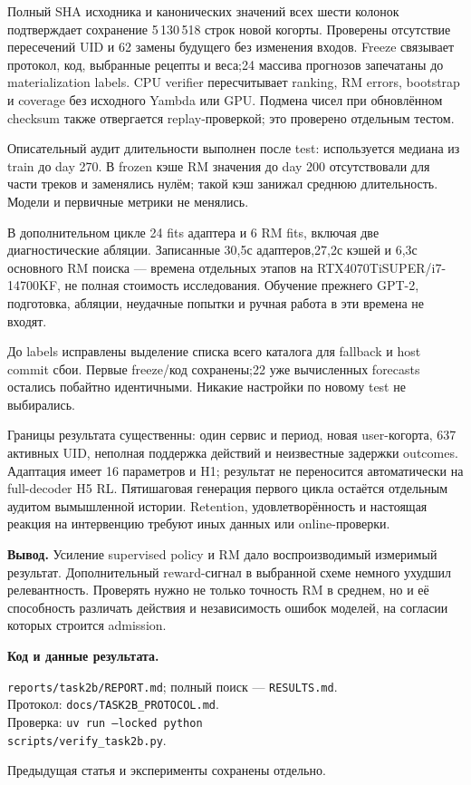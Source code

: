 \documentclass[10pt,a4paper,twocolumn]{article}
\begin{document}
Полный SHA исходника и канонических значений всех шести колонок подтверждает
сохранение 5\,130\,518 строк новой когорты. Проверены отсутствие пересечений UID
и 62 замены будущего без изменения входов. Freeze связывает протокол, код,
выбранные рецепты и веса;24 массива прогнозов запечатаны до materialization
labels. CPU verifier пересчитывает ranking, RM errors, bootstrap и coverage
без исходного Yambda или GPU. Подмена чисел при обновлённом checksum также
отвергается replay-проверкой; это проверено отдельным тестом.

Описательный аудит длительности выполнен после test: используется медиана
из train до day 270. В frozen кэше RM значения до day 200 отсутствовали для
части треков и заменялись нулём; такой кэш занижал среднюю длительность.
Модели и первичные метрики не менялись.

В дополнительном цикле 24 fits адаптера и 6 RM fits, включая две диагностические
абляции. Записанные 30,5с адаптеров,27,2с кэшей и 6,3с основного RM поиска ---
времена отдельных этапов на RTX4070TiSUPER/i7-14700KF, не полная стоимость
исследования. Обучение прежнего GPT-2, подготовка, абляции, неудачные попытки
и ручная работа в эти времена не входят.

До labels исправлены выделение списка всего каталога для fallback и host
commit сбои. Первые freeze/код сохранены;22 уже вычисленных forecasts
остались побайтно идентичными. Никакие настройки по новому test не выбирались.

Границы результата существенны: один сервис и период, новая user-когорта,
637 активных UID, неполная поддержка действий и неизвестные задержки outcomes.
Адаптация имеет 16 параметров и H1; результат не переносится автоматически
на full-decoder H5 RL. Пятишаговая генерация первого цикла остаётся отдельным
аудитом вымышленной истории. Retention, удовлетворённость и настоящая
реакция на интервенцию требуют иных данных или online-проверки.

\textbf{Вывод.} Усиление supervised policy и RM дало воспроизводимый
измеримый результат. Дополнительный reward-сигнал в выбранной схеме
немного ухудшил релевантность. Проверять нужно не только точность RM
в среднем, но и её способность различать действия и независимость
ошибок моделей, на согласии которых строится admission.

\vspace{3pt}
\noindent\textbf{Код и данные результата.}\par
{\footnotesize\raggedright\noindent
\nolinkurl{reports/task2b/REPORT.md}; полный поиск --- \texttt{RESULTS.md}.\\
Протокол: \nolinkurl{docs/TASK2B_PROTOCOL.md}.\\
Проверка: \texttt{uv run --locked python}\\
\nolinkurl{scripts/verify_task2b.py}.\par}
\noindent Предыдущая статья и эксперименты сохранены отдельно.
\end{document}
